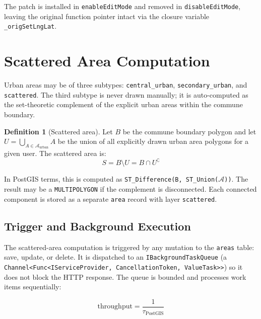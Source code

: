 \documentclass[12pt,a4paper]{article}
\theoremstyle{definition}
\newtheorem{definition}{Definition}[section]
\theoremstyle{plain}
\theoremstyle{remark}
\begin{document}
The patch is installed in \texttt{enableEditMode} and removed in
\texttt{disableEditMode}, leaving the original function pointer intact via
the closure variable \texttt{\_origSetLngLat}.

\section{Scattered Area Computation}
\label{sec:scattered}

Urban areas may be of three subtypes: \texttt{central\_urban},
\texttt{secondary\_urban}, and \texttt{scattered}. The third subtype is
never drawn manually; it is auto-computed as the set-theoretic complement
of the explicit urban areas within the commune boundary.

\begin{definition}[Scattered area]
Let $B$ be the commune boundary polygon and let
$U = \bigcup_{A \in \mathcal{A}_{\text{urban}}} A$
be the union of all explicitly drawn urban area polygons for a given user.
The scattered area is:
\begin{equation}
  S = B \setminus U = B \cap U^{\complement}
  \label{eq:scattered}
\end{equation}
\end{definition}

In PostGIS terms, this is computed as
\texttt{ST\_Difference(B, ST\_Union($\mathcal{A}$))}.
The result may be a \texttt{MULTIPOLYGON} if the complement is
disconnected. Each connected component is stored as a separate
\texttt{area} record with layer \texttt{scattered}.

\subsection{Trigger and Background Execution}

The scattered-area computation is triggered by any mutation to the
\texttt{areas} table: save, update, or delete. It is dispatched to an
\texttt{IBackgroundTaskQueue} (a \texttt{Channel<Func<IServiceProvider,
CancellationToken, ValueTask>>}) so it does not block the HTTP response.
The queue is bounded and processes work items sequentially:

\begin{equation}
  \mathrm{throughput} = \frac{1}{\tau_{\text{PostGIS}}}
  \label{eq:queue_throughput}
\end{equation}
\end{document}
